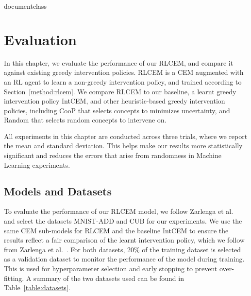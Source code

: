 \csname documentclass

\chapter{Evaluation}

In this chapter, we evaluate the performance of our RLCEM, and compare it 
against existing greedy intervention policies. RLCEM is a CEM augmented with an RL agent
to learn a non-greedy intervention policy, and trained according to Section~\ref{method:rlcem}.
We compare RLCEM to our baseline, a learnt greedy intervention policy IntCEM, and other
heuristic-based greedy intervention policies, 
including CooP that selects concepts to minimizes uncertainty, 
and Random that selects
random concepts to intervene on.


All experiments in this chapter
are conducted across three trials, where we report the mean
and standard deviation. This helps make our results more statistically significant and reduces the errors
that arise from randomness in Machine
Learning experiments.

\section{Models and Datasets}\label{method:datasets}
To evaluate the performance of our RLCEM model,
we follow Zarlenga et al.~\cite{intcem} and select the datasets MNIST-ADD and CUB for 
our experiments. 
We use the same CEM sub-models
for RLCEM and the baseline IntCEM to ensure the results reflect a fair comparison 
of the learnt intervention policy, which we follow from Zarlenga et al.~\cite{intcem}.
For both datasets, 20\% of the training dataset is selected
as a validation dataset to monitor
the performance of the model during training. This is used for hyperparameter
selection and early stopping to prevent over-fitting. A summary of the two
datasets used can be found in Table~\ref{table:datasets}.

